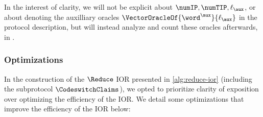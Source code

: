 In the interest of clarity, we will not be explicit about $\numIP, \numTIP, \ell_{\aux}$, or about denoting the auxilliary oracles $\VectorOracleOf{\word^{\aux}}{\ell_{\aux}}$ in the protocol description, but will instead analyze and count these oracles afterwards, in \XXX.





\subsubsection{Optimizations}

In the construction of the $\Reduce$ IOR presented in \cref{alg:reduce-ior} (including the subprotocol $\CodeswitchClaims$), we opted to prioritize clarity of exposition over optimizing the efficiency of the IOR.
We detail some optimizations that improve the efficiency of the IOR below:
